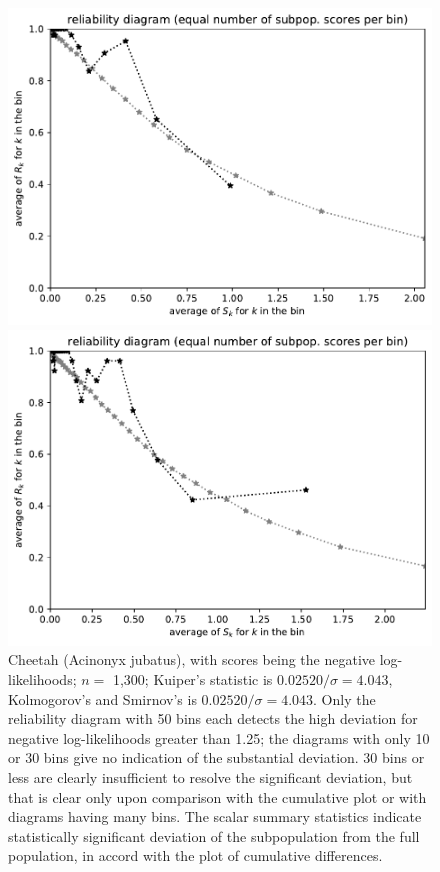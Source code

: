 \documentclass{article}
\begin{document}
\begin{figure}
\begin{centering}
\parbox{\imsize}{\includegraphics[width=\imsize]
{./codes/unweighted/nll-1-293-cheetah-chetah-Acinonyx-jubatusequisamps30}}
\quad\quad
\parbox{\imsize}{\includegraphics[width=\imsize]
{./codes/unweighted/nll-1-293-cheetah-chetah-Acinonyx-jubatusequisamps50}}

\end{centering}
\caption{Cheetah (Acinonyx jubatus),
         with scores being the negative log-likelihoods;
         $n =$ 1,300; Kuiper's statistic is $0.02520 / \sigma = 4.043$,
         Kolmogorov's and Smirnov's is $0.02520 / \sigma = 4.043$.
Only the reliability diagram with 50 bins each
detects the high deviation for negative log-likelihoods
greater than 1.25; the diagrams with only 10 or 30 bins give no indication
of the substantial deviation. 30 bins or less are clearly insufficient
to resolve the significant deviation, but that is clear only upon comparison
with the cumulative plot or with diagrams having many bins.
The scalar summary statistics indicate statistically significant deviation
of the subpopulation from the full population, in accord with the plot
of cumulative differences.
}
\label{cheetah-chetah-Acinonyx-jubatus-nll}
\end{figure}
\end{document}

